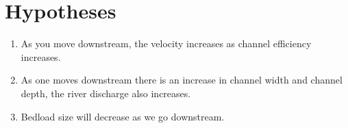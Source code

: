 \section{Hypotheses}
\label{sec:hypotheses}

\vspace*{0.5cm}


\begin{enumerate}
	\item As you move downstream, the velocity increases as channel efficiency increases. 
	\item As one moves downstream there is an increase in channel width and channel depth, the river discharge also increases.     
	\item Bedload size will decrease as we go downstream.
\end{enumerate}

